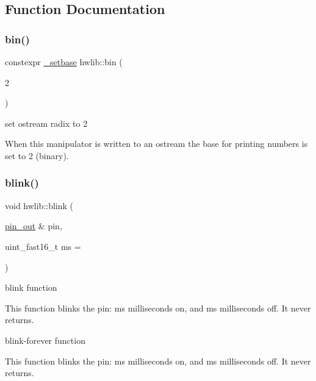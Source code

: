  

\subsection{Function Documentation}
\mbox{\label{namespacehwlib_a2f624a643c9c8d30b5e4f3dca914e28e}} 
\subsubsection{\texorpdfstring{bin()}{bin()}}
{\footnotesize\ttfamily constexpr \hyperlink{structhwlib_1_1__setbase}{\+\_\+setbase} hwlib\+::bin (\begin{DoxyParamCaption}\item[{2}]{ }\end{DoxyParamCaption})}

set ostream radix to 2

When this manipulator is written to an ostream the base for printing numbers is set to 2 (binary). \mbox{\label{namespacehwlib_a07ec2b554dc2b3f7e20acfa07158bbdc}} 
\subsubsection{\texorpdfstring{blink()}{blink()}\hspace{0.1cm}{\footnotesize\ttfamily [1/6]}}
{\footnotesize\ttfamily void hwlib\+::blink (\begin{DoxyParamCaption}\item[{\hyperlink{classhwlib_1_1pin__out}{pin\+\_\+out} \&}]{pin,  }\item[{uint\+\_\+fast16\+\_\+t}]{ms = {} }\end{DoxyParamCaption})}



blink function 

This function blinks the pin\+: ms milliseconds on, and ms milliseconds off. It never returns.

blink-\/forever function

This function blinks the pin\+: ms milliseconds on, and ms milliseconds off. It never returns. \mbox{\label{namespacehwlib_a4da0954a246d92ba3e62f22fa52bf3a3}} 
